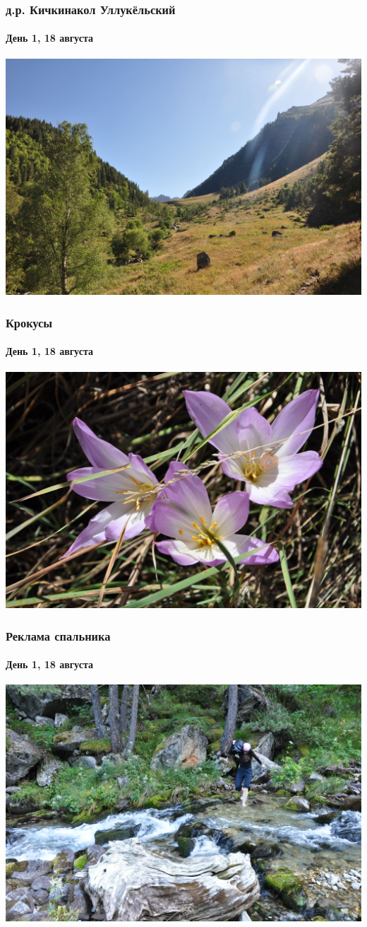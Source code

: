 \begin{frame}
	\frametitle{д.р. Кичкинакол Уллукёльский}
	\framesubtitle{День 1, 18 августа}
	\centering
	\includegraphics[width=\linewidth]{../pics/DSC_0528}
\end{frame}

\begin{frame}
	\frametitle{Крокусы}
	\framesubtitle{День 1, 18 августа}
	\centering
	\includegraphics[width=\linewidth]{../pics/DSC_0534}
\end{frame}

\begin{frame}
	\frametitle{Реклама спальника}
	\framesubtitle{День 1, 18 августа}
	\centering
	\includegraphics[width=\linewidth]{../pics/DSC_0550}
\end{frame}

